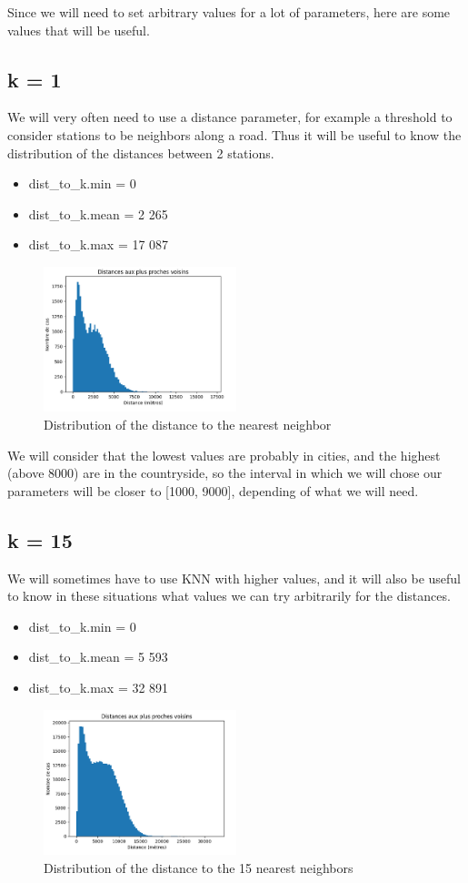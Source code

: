 \documentclass[main.tex]{subfiles}
\begin{document}
Since we will need to set arbitrary values for a lot of parameters, here are some values that will be useful.

\subsection*{k = 1}

We will very often need to use a distance parameter, for example a threshold to consider stations to be neighbors along a road. Thus it will be useful to know the distribution of the distances between 2 stations.
\begin{itemize}
    \item dist\_to\_k.min = 0
    \item dist\_to\_k.mean = 2 265
    \item dist\_to\_k.max = 17 087
\end{itemize}

\begin{figure}[H]
    \centering
    \includegraphics[width=0.5\textwidth]{Images/Didtrib_dist_1voisin.png}
    \caption{Distribution of the distance to the nearest neighbor}
\end{figure}

We will consider that the lowest values are probably in cities, and the highest (above 8000) are in the countryside, so the interval in which we will chose our parameters will be closer to [1000, 9000], depending of what we will need.

\subsection*{k = 15}

We will sometimes have to use KNN with higher values, and it will also be useful to know in these situations what values we can try arbitrarily for the distances. 
\begin{itemize}
    \item dist\_to\_k.min = 0
    \item dist\_to\_k.mean = 5 593
    \item dist\_to\_k.max = 32 891
\end{itemize}

\begin{figure}[H]
    \centering
    \includegraphics[width=0.5\textwidth]{Images/Didtrib_dist_15voisin.png}
    \caption{Distribution of the distance to the 15 nearest neighbors}
\end{figure}
\end{document}
